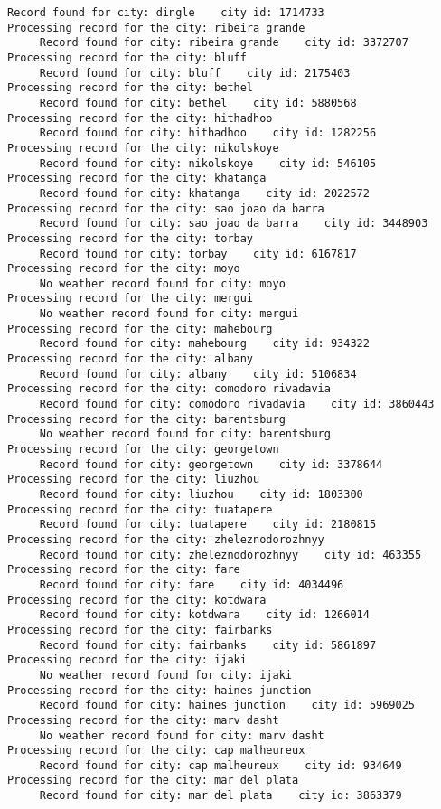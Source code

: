 \documentclass[11pt]{article}
\begin{document}
\begin{Verbatim}[commandchars=\\\{\}]
     Record found for city: dingle    city id: 1714733
Processing record for the city: ribeira grande
     Record found for city: ribeira grande    city id: 3372707
Processing record for the city: bluff
     Record found for city: bluff    city id: 2175403
Processing record for the city: bethel
     Record found for city: bethel    city id: 5880568
Processing record for the city: hithadhoo
     Record found for city: hithadhoo    city id: 1282256
Processing record for the city: nikolskoye
     Record found for city: nikolskoye    city id: 546105
Processing record for the city: khatanga
     Record found for city: khatanga    city id: 2022572
Processing record for the city: sao joao da barra
     Record found for city: sao joao da barra    city id: 3448903
Processing record for the city: torbay
     Record found for city: torbay    city id: 6167817
Processing record for the city: moyo
     No weather record found for city: moyo
Processing record for the city: mergui
     No weather record found for city: mergui
Processing record for the city: mahebourg
     Record found for city: mahebourg    city id: 934322
Processing record for the city: albany
     Record found for city: albany    city id: 5106834
Processing record for the city: comodoro rivadavia
     Record found for city: comodoro rivadavia    city id: 3860443
Processing record for the city: barentsburg
     No weather record found for city: barentsburg
Processing record for the city: georgetown
     Record found for city: georgetown    city id: 3378644
Processing record for the city: liuzhou
     Record found for city: liuzhou    city id: 1803300
Processing record for the city: tuatapere
     Record found for city: tuatapere    city id: 2180815
Processing record for the city: zheleznodorozhnyy
     Record found for city: zheleznodorozhnyy    city id: 463355
Processing record for the city: fare
     Record found for city: fare    city id: 4034496
Processing record for the city: kotdwara
     Record found for city: kotdwara    city id: 1266014
Processing record for the city: fairbanks
     Record found for city: fairbanks    city id: 5861897
Processing record for the city: ijaki
     No weather record found for city: ijaki
Processing record for the city: haines junction
     Record found for city: haines junction    city id: 5969025
Processing record for the city: marv dasht
     No weather record found for city: marv dasht
Processing record for the city: cap malheureux
     Record found for city: cap malheureux    city id: 934649
Processing record for the city: mar del plata
     Record found for city: mar del plata    city id: 3863379

\end{Verbatim}
\end{document}
